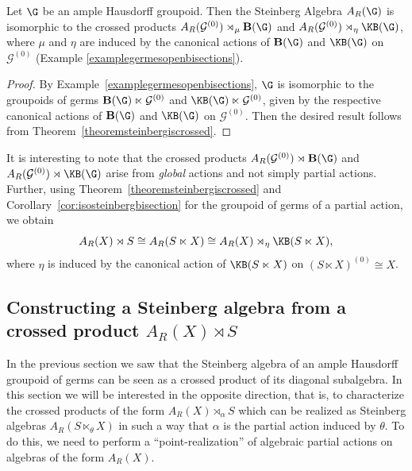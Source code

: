 \begin{corollary}\label{cor:isosteinbergbisection}
Let $\G$ be an ample Hausdorff groupoid. Then the Steinberg Algebra $A_R(\G)$ is isomorphic to the crossed products $A_R(\mathcal{G}^{(0)})\rtimes_{\mu}\operatorname{\mathbf{B}}(\G)$ and $A_R(\mathcal{G}^{(0)})\rtimes_{\eta}\KB(\G)$, where $\mu$ and $\eta$ are induced by the canonical actions of $\operatorname{\mathbf{B}}(\G)$ and $\KB(\G)$ on $\mathcal{G}^{(0)}$ (Example \ref{examplegermesopenbisections}).
\end{corollary}

\begin{proof}
By Example~\ref{examplegermesopenbisections}, $\G$ is isomorphic to the groupoids of germs $\operatorname{\bf{B}}(\G)\ltimes\mathcal{G}^{(0)}$ and $\KB(\G)\ltimes\mathcal{G}^{(0)}$, given by the respective canonical actions of $\operatorname{\bf{B}}(\G)$ and $\KB(\G)$ on $\mathcal{G}^{(0)}$. Then the desired result follows from Theorem~\ref{theoremsteinbergiscrossed}.
\end{proof}

It is interesting to note that the crossed products $A_R(\mathcal{G}^{(0)})\rtimes\operatorname{\mathbf{B}}(\G)$ and $A_R(\mathcal{G}^{(0)})\rtimes\KB(\G)$ arise from \emph{global} actions and not simply partial actions. Further, using Theorem~\ref{theoremsteinbergiscrossed} and Corollary~\ref{cor:isosteinbergbisection} for the groupoid of germs of a partial action, we obtain
\[A_R(X)\rtimes S\cong A_R(S\ltimes X)\cong A_R(X)\rtimes_\eta \KB(S\ltimes X),\]
where $\eta$ is induced by the canonical action of $\KB(S\ltimes X)$ on $(S\ltimes X)^{(0)}\cong X$.

\subsection{Constructing a Steinberg algebra from a crossed product $A_R(X)\rtimes S$}

In the previous section we saw that the Steinberg algebra of an ample Hausdorff groupoid of germs can be seen as a crossed product of its diagonal subalgebra. In this section we will be interested in the opposite direction, that is, to characterize the crossed products of the form $A_R(X)\rtimes_{\alpha}S$ which can be realized as Steinberg algebras $A_R(S\ltimes_\theta X)$ in such a way that $\alpha$ is the partial action induced by $\theta$. To do this, we need to perform a ``point-realization'' of algebraic partial actions on algebras of the form $A_R(X)$.

